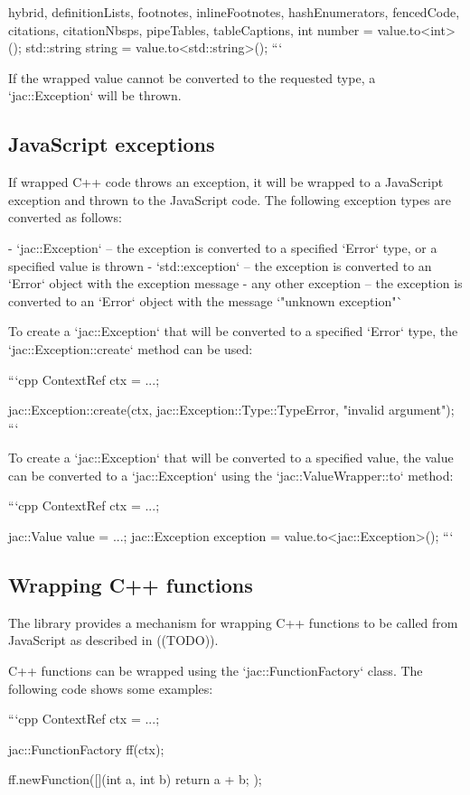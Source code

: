 \documentclass[
  digital,
  oneside,
  nosansbold,
  nocolorbold,
  lof,
  lot
]{fithesis4}
\begin{document}
\begin{markdown*}{%
  hybrid,
  definitionLists,
  footnotes,
  inlineFootnotes,
  hashEnumerators,
  fencedCode,
  citations,
  citationNbsps,
  pipeTables,
  tableCaptions,
}
int number = value.to<int>();
std::string string = value.to<std::string>();
```

If the wrapped value cannot be converted to the requested type, a `jac::Exception` will be thrown.

\subsection{JavaScript exceptions}

If wrapped C++ code throws an exception, it will be wrapped to a JavaScript exception and thrown to the JavaScript code. The following exception types are converted as follows:

  - `jac::Exception` -- the exception is converted to a specified `Error` type, or a specified value is thrown
  - `std::exception` -- the exception is converted to an `Error` object with the exception message
  - any other exception -- the exception is converted to an `Error` object with the message `"unknown exception"`

To create a `jac::Exception` that will be converted to a specified `Error` type, the `jac::Exception::create` method can be used:

```cpp
ContextRef ctx = ...;

jac::Exception::create(ctx, jac::Exception::Type::TypeError, "invalid argument");
```

To create a `jac::Exception` that will be converted to a specified value, the value can be converted to a `jac::Exception` using the `jac::ValueWrapper::to` method:

```cpp
ContextRef ctx = ...;

jac::Value value = ...;
jac::Exception exception = value.to<jac::Exception>();
```

\subsection{Wrapping C++ functions}

The library provides a mechanism for wrapping C++ functions to be called from JavaScript as described in ((TODO)).

C++ functions can be wrapped using the `jac::FunctionFactory` class. The following code shows some examples:

```cpp
ContextRef ctx = ...;

jac::FunctionFactory ff(ctx);

ff.newFunction([](int a, int b) { return a + b; });


\end{markdown*}
\end{document}

